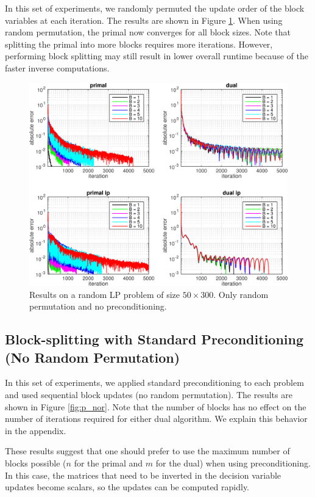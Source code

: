 \documentclass{article}
\begin{document}
In this set of experiments, we randomly permuted the update order of the block variables at each iteration. The results are shown in Figure \ref{fig:nop_r}. When using random permutation, the primal now converges for all block sizes. Note that splitting the primal into more blocks requires more iterations. However, performing block splitting may still result in lower overall runtime because of the faster inverse computations. 

\begin{figure}[h]
	\includegraphics[width=\textwidth]{../figures/noprecond_rndperm.png}
	\caption{Results on a random LP problem of size $50 \times 300$. Only random permutation and no preconditioning.}
	\label{fig:nop_r}
\end{figure}

\subsection*{Block-splitting with Standard Preconditioning (No Random Permutation)}
In this set of experiments, we applied standard preconditioning to each problem and used sequential block updates (no random permutation). The results are shown in Figure \ref{fig:p_nor}. Note that the number of blocks has no effect on the number of iterations required for either dual algorithm. We explain this behavior in the appendix. 

These results suggest that one should prefer to use the maximum number of blocks possible ($n$ for the primal and $m$ for the dual) when using preconditioning. In this case, the matrices that need to be inverted in the decision variable updates become scalars, so the updates can be computed rapidly.
\end{document}
